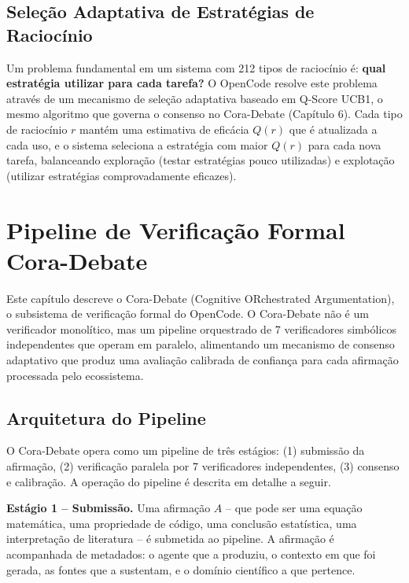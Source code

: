 \documentclass[12pt,a4paper,sumario=tradicional,openany]{abntex2}
\begin{document}
\section{Seleção Adaptativa de Estratégias de Raciocínio}

Um problema fundamental em um sistema com 212 tipos de raciocínio é: \textbf{qual estratégia utilizar para cada tarefa?} O OpenCode resolve este problema através de um mecanismo de seleção adaptativa baseado em Q-Score UCB1, o mesmo algoritmo que governa o consenso no Cora-Debate (Capítulo 6). Cada tipo de raciocínio $r$ mantém uma estimativa de eficácia $Q(r)$ que é atualizada a cada uso, e o sistema seleciona a estratégia com maior $Q(r)$ para cada nova tarefa, balanceando exploração (testar estratégias pouco utilizadas) e explotação (utilizar estratégias comprovadamente eficazes).

\chapter{Pipeline de Verificação Formal Cora-Debate}

Este capítulo descreve o Cora-Debate (Cognitive ORchestrated Argumentation), o subsistema de verificação formal do OpenCode. O Cora-Debate não é um verificador monolítico, mas um pipeline orquestrado de 7 verificadores simbólicos independentes que operam em paralelo, alimentando um mecanismo de consenso adaptativo que produz uma avaliação calibrada de confiança para cada afirmação processada pelo ecossistema.

\section{Arquitetura do Pipeline}

O Cora-Debate opera como um pipeline de três estágios: (1) submissão da afirmação, (2) verificação paralela por 7 verificadores independentes, (3) consenso e calibração. A operação do pipeline é descrita em detalhe a seguir.

\textbf{Estágio 1 -- Submissão.} Uma afirmação $A$ -- que pode ser uma equação matemática, uma propriedade de código, uma conclusão estatística, uma interpretação de literatura -- é submetida ao pipeline. A afirmação é acompanhada de metadados: o agente que a produziu, o contexto em que foi gerada, as fontes que a sustentam, e o domínio científico a que pertence.
\end{document}
